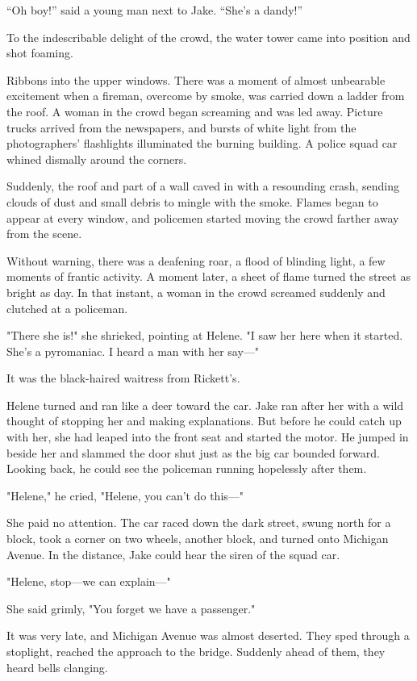 \documentclass{novel}
\begin{document}
“Oh boy!” said a young man next to Jake. “She’s a dandy!”

To the indescribable delight of the crowd, the water tower came into position and shot foaming.

Ribbons into the upper windows. There was a moment of almost unbearable excitement when a fireman, overcome by smoke, was carried down a ladder from the roof. A woman in the crowd began screaming and was led away. Picture trucks arrived from the newspapers, and bursts of white light from the photographers' flashlights illuminated the burning building. A police squad car whined dismally around the corners.

Suddenly, the roof and part of a wall caved in with a resounding crash, sending clouds of dust and small debris to mingle with the smoke. Flames began to appear at every window, and policemen started moving the crowd farther away from the scene.

Without warning, there was a deafening roar, a flood of blinding light, a few moments of frantic activity. A moment later, a sheet of flame turned the street as bright as day. In that instant, a woman in the crowd screamed suddenly and clutched at a policeman.

"There she is!" she shrieked, pointing at Helene. "I saw her here when it started. She's a pyromaniac. I heard a man with her say—"

It was the black-haired waitress from Rickett's.

Helene turned and ran like a deer toward the car. Jake ran after her with a wild thought of stopping her and making explanations. But before he could catch up with her, she had leaped into the front seat and started the motor. He jumped in beside her and slammed the door shut just as the big car bounded forward. Looking back, he could see the policeman running hopelessly after them.

"Helene," he cried, "Helene, you can't do this—"

She paid no attention. The car raced down the dark street, swung north for a block, took a corner on two wheels, another block, and turned onto Michigan Avenue. In the distance, Jake could hear the siren of the squad car.

"Helene, stop—we can explain—"

She said grimly, "You forget we have a passenger."

It was very late, and Michigan Avenue was almost deserted. They sped through a stoplight, reached the approach to the bridge. Suddenly ahead of them, they heard bells clanging.
\end{document}
